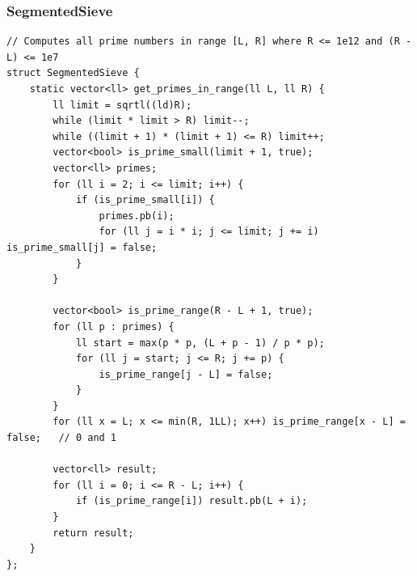 \documentclass[9pt,a4paper,twocolumn]{extarticle}
\begin{document}
\subsubsection{SegmentedSieve}
\nopagebreak
\begin{lstlisting}
// Computes all prime numbers in range [L, R] where R <= 1e12 and (R - L) <= 1e7
struct SegmentedSieve {
    static vector<ll> get_primes_in_range(ll L, ll R) {
        ll limit = sqrtl((ld)R);
        while (limit * limit > R) limit--;
        while ((limit + 1) * (limit + 1) <= R) limit++;
        vector<bool> is_prime_small(limit + 1, true);
        vector<ll> primes;
        for (ll i = 2; i <= limit; i++) {
            if (is_prime_small[i]) {
                primes.pb(i);
                for (ll j = i * i; j <= limit; j += i) is_prime_small[j] = false;
            }
        }

        vector<bool> is_prime_range(R - L + 1, true);
        for (ll p : primes) {
            ll start = max(p * p, (L + p - 1) / p * p);
            for (ll j = start; j <= R; j += p) {
                is_prime_range[j - L] = false;
            }
        }
        for (ll x = L; x <= min(R, 1LL); x++) is_prime_range[x - L] = false;   // 0 and 1

        vector<ll> result;
        for (ll i = 0; i <= R - L; i++) {
            if (is_prime_range[i]) result.pb(L + i);
        }
        return result;
    }
};
\end{lstlisting}

\filbreak
\end{document}
